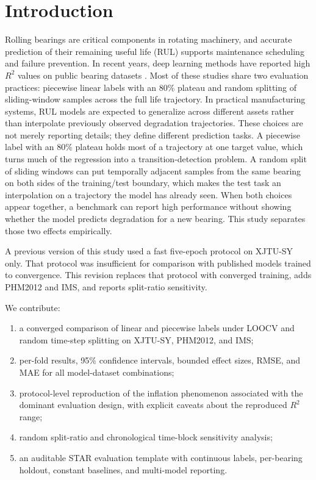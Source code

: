 \documentclass[5p,twocolumn]{elsarticle}
\begin{document}
\section{Introduction}
Rolling bearings are critical components in rotating machinery, and accurate prediction of their remaining useful life (RUL) supports maintenance scheduling and failure prevention. In recent years, deep learning methods have reported high $R^2$ values on public bearing datasets \cite{rul_lstm_uq_2022,reg_lstm_2021,gru_tim_2021,transformer_tim_2023}. Most of these studies share two evaluation practices: piecewise linear labels with an 80\% plateau and random splitting of sliding-window samples across the full life trajectory.
In practical manufacturing systems, RUL models are expected to generalize across different assets rather than interpolate previously observed degradation trajectories. These choices are not merely reporting details; they define different prediction tasks. A piecewise label with an 80\% plateau holds most of a trajectory at one target value, which turns much of the regression into a transition-detection problem. A random split of sliding windows can put temporally adjacent samples from the same bearing on both sides of the training/test boundary, which makes the test task an interpolation on a trajectory the model has already seen. When both choices appear together, a benchmark can report high performance without showing whether the model predicts degradation for a new bearing. This study separates those two effects empirically.

A previous version of this study used a fast five-epoch protocol on XJTU-SY only. That protocol was insufficient for comparison with published models trained to convergence. This revision replaces that protocol with converged training, adds PHM2012 and IMS, and reports split-ratio sensitivity.

We contribute:
\begin{enumerate}
    \item a converged comparison of linear and piecewise labels under LOOCV and random time-step splitting on XJTU-SY, PHM2012, and IMS;
    \item per-fold results, 95\% confidence intervals, bounded effect sizes, RMSE, and MAE for all model-dataset combinations;
    \item protocol-level reproduction of the inflation phenomenon associated with the dominant evaluation design, with explicit caveats about the reproduced $R^2$ range;
    \item random split-ratio and chronological time-block sensitivity analysis;
\item an auditable STAR evaluation template with continuous labels, per-bearing holdout, constant baselines, and multi-model reporting.
\end{enumerate}
\end{document}
